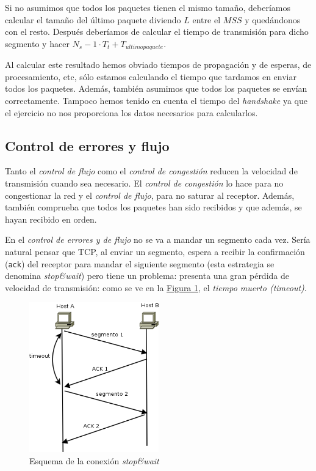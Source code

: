 \documentclass[10pt,a4paper,spanish]{report}
\begin{document}
\begin{enumerate}[\bf a)]
  Si no asumimos que todos los paquetes tienen el mismo tamaño, deberíamos calcular el tamaño del último paquete diviendo $L$ entre el $MSS$ y quedándonos con el resto. Después deberíamos de calcular el tiempo de transmisión para dicho segmento y hacer $N_s - 1 \cdot T_t + T_{ultimopaquete}$.

  Al calcular este resultado hemos obviado tiempos de propagación y de esperas, de procesamiento, etc, sólo estamos calculando el tiempo que tardamos en enviar todos los paquetes. Además, también asumimos que todos los paquetes se envían correctamente. Tampoco hemos tenido en cuenta el tiempo del \textit{\textcolor{tema3}{handshake}} ya que el ejercicio no nos proporciona los datos necesarios para calcularlos.
\end{enumerate}

\subsection{\textcolor{tema3}Control de errores y flujo}
Tanto el \textit{\textcolor{tema3}{control de flujo}} como el \textcolor{tema3}{\textit{control de congestión}} reducen la velocidad de transmisión cuando sea necesario. El \textit{\textcolor{tema3}{control de congestión}} lo hace para no congestionar la red y el \textit{\textcolor{tema3}{control de flujo}}, para no saturar al receptor. Además, también comprueba que todos los paquetes han sido recibidos y que además, se hayan recibido en orden.

En el \textit{\textcolor{tema3}{control de errores y de flujo}} no se va a mandar un segmento cada vez. Sería natural pensar que TCP, al enviar un segmento, espera a recibir la confirmación (\texttt{ack}) del receptor para mandar el siguiente segmento (esta estrategia se denomina \textit{\textcolor{tema3}{stop\&wait}}) pero tiene un problema: presenta una gran pérdida de velocidad de transmisión: como se ve en la \hyperref[stopwait]{Figura \ref*{stopwait}}, el \textit{\textcolor{tema3}{tiempo muerto (timeout)}}.

\begin{figure}[!h]
  \centering
  \includegraphics[width=0.5\textwidth]{timeout}
  \caption{Esquema de la conexión \textit{stop\&wait}}
  \label{stopwait}
\end{figure}
\end{document}
